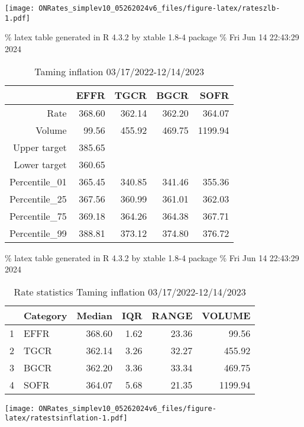 \documentclass[
]{article}
\let\origfigure\figure
\let\endorigfigure\endfigure
\renewenvironment{figure}[1][2] {
    \expandafter\origfigure\expandafter[H]
} {
    \endorigfigure
}
\begin{document}
\begin{figure}
\centering
\texttt{[image: ONRates\_simplev10\_05262024v6\_files/figure-latex/rateszlb-1.pdf]}
\caption{\label{fig:rateszlb}EFFR during zero lower bound (zlb) period 3/17/2020-3/16/2022}
\end{figure}

\% latex table generated in R 4.3.2 by xtable 1.8-4 package
\% Fri Jun 14 22:43:29 2024

\begin{table}[ht]
\centering
\begin{tabular}{rrrrr}
  \hline
 & EFFR & TGCR & BGCR & SOFR \\ 
  \hline
Rate & 368.60 & 362.14 & 362.20 & 364.07 \\ 
  Volume & 99.56 & 455.92 & 469.75 & 1199.94 \\ 
  Upper target & 385.65 &  &  &  \\ 
  Lower target & 360.65 &  &  &  \\ 
  Percentile\_01 & 365.45 & 340.85 & 341.46 & 355.36 \\ 
  Percentile\_25 & 367.56 & 360.99 & 361.01 & 362.03 \\ 
  Percentile\_75 & 369.18 & 364.26 & 364.38 & 367.71 \\ 
  Percentile\_99 & 388.81 & 373.12 & 374.80 & 376.72 \\ 
   \hline
\end{tabular}
\caption{Taming inflation 03/17/2022-12/14/2023} 
\end{table}

\% latex table generated in R 4.3.2 by xtable 1.8-4 package
\% Fri Jun 14 22:43:29 2024

\begin{table}[ht]
\centering
\begin{tabular}{rlrrrr}
  \hline
 & Category & Median & IQR & RANGE & VOLUME \\ 
  \hline
1 & EFFR & 368.60 & 1.62 & 23.36 & 99.56 \\ 
  2 & TGCR & 362.14 & 3.26 & 32.27 & 455.92 \\ 
  3 & BGCR & 362.20 & 3.36 & 33.34 & 469.75 \\ 
  4 & SOFR & 364.07 & 5.68 & 21.35 & 1199.94 \\ 
   \hline
\end{tabular}
\caption{Rate statistics Taming inflation 03/17/2022-12/14/2023} 
\end{table}

\begin{figure}
\centering
\texttt{[image: ONRates\_simplev10\_05262024v6\_files/figure-latex/ratestsinflation-1.pdf]}
\caption{\label{fig:ratestsinflation}Rates during Taming inflation 3/17/2022-12/14/2023}
\end{figure}
\end{document}
